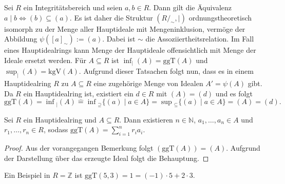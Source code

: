 \begin{remark}
    Sei $R$ ein Integritätsbereich und seien $a,b\in R$. Dann gilt die Äquivalenz
    $a\mid b\Leftrightarrow (b)\subseteq (a)$. Es ist daher die Struktur
    $(R/_\sim,\mid)$ ordnungstheoretisch isomorph zu der Menge aller Hauptideale mit Mengeninklusion,
    vermöge der Abbildung $\psi([a]_\sim):= (a)$. Dabei ist $\sim$ die Assoziiertheitsrelation. Im Fall eines
    Hauptidealrings kann \glqq Menge der Hauptideale\grqq{} offensichtlich mit \glqq Menge der Ideale\grqq{}
    ersetzt werden. Für $A\subseteq R$ ist $\inf_{\vert}(A)=\mathrm{ggT}(A)$ und $\sup_{\vert}(A)=\mathrm{kgV}(A)$.
    Aufgrund dieser Tatsachen folgt nun, dass es in einem Hauptidealring $R$
    zu $A\subseteq R$ eine zugehörige Menge von Idealen $A'=\psi(A)$ gibt. Da $R$ ein Hauptidealring ist,
    existiert ein $d\in R$ mit $(A)=(d)$ und es folgt
    $$\mathrm{ggT}(A)=\inf{}_|(A)\widehat{=}\inf{}_{\supseteq}\{(a)\mid a\in A\}=\sup{}_\subseteq\{(a)\mid a\in A\}=(A)=(d).$$
\end{remark}

\begin{lemma}
    Sei $R$ ein Hauptidealring und $A\subseteq R$. Dann existieren
    $n\in\mathbb{N}$, $a_1,\ldots,a_n\in A$ und $r_1,\ldots,r_n\in R$, sodass $\mathrm{ggT}(A)=\sum_{i=1}^nr_ia_i$.
\end{lemma}

\begin{proof}
    Aus der vorangegangen Bemerkung folgt $(\textrm{ggT}(A))=(A)$. Aufgrund der Darstellung über das erzeugte Ideal folgt die Behauptung.
\end{proof}

\begin{example}
    Ein Beispiel in $R=\mathbb{Z}$ ist $\textrm{ggT}(5,3)=1=(-1)\cdot 5+2\cdot 3$.
\end{example}